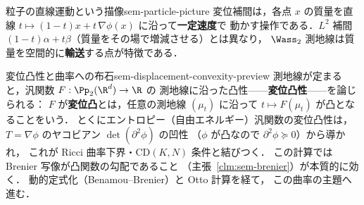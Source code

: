 \begin{remark}{粒子の直線運動という描像}{sem-particle-picture}
  変位補間は，各点 $x$ の質量を直線
  $t \mapsto (1-t)x + t\,\nabla\phi(x)$ に沿って\textbf{一定速度}で
  動かす操作である．$L^2$ 補間
  $(1-t)\alpha + t\beta$（質量をその場で増減させる）とは異なり，
  $\Wass_2$ 測地線は質量を空間的に\textbf{輸送}する点が特徴である．
\end{remark}

\begin{remark}{変位凸性と曲率への布石}{sem-displacement-convexity-preview}
  測地線が定まると，汎関数 $F : \Pp_2(\R^d) \to \R$ の
  測地線に沿った凸性——\textbf{変位凸性}——を論じられる：
  $F$ が\textbf{変位凸}とは，任意の測地線 $(\mu_t)$ に沿って
  $t \mapsto F(\mu_t)$ が凸となることをいう．
  とくにエントロピー（自由エネルギー）汎関数の変位凸性は，
  $T = \nabla\phi$ のヤコビアン $\det(\partial^2\phi)$ の凹性
  （$\phi$ が凸なので $\partial^2\phi \succeq 0$）から導かれ，
  これが Ricci 曲率下界・CD$(K,N)$ 条件と結びつく．
  この計算では Brenier 写像が凸関数の勾配であること
  （主張~\ref{clm:sem-brenier}）が本質的に効く．
  動的定式化（Benamou--Brenier）と Otto 計算を経て，
  この曲率の主題へ進む．
\end{remark}
